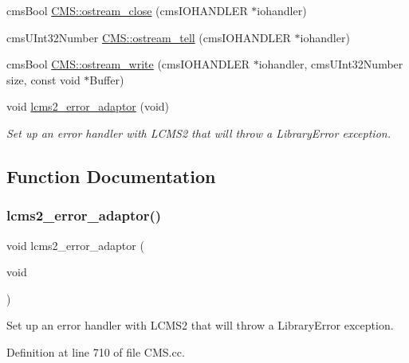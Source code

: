 \begin{DoxyCompactItemize}
\item 
cms\+Bool \hyperlink{namespace_c_m_s_a57d6234e6fb36cc71bcae4a825ad3ba0}{C\+M\+S\+::ostream\+\_\+close} (cms\+I\+O\+H\+A\+N\+D\+L\+ER $\ast$iohandler)
\item 
cms\+U\+Int32\+Number \hyperlink{namespace_c_m_s_a4420e9cff988db0418ae3a9c76ec5f9e}{C\+M\+S\+::ostream\+\_\+tell} (cms\+I\+O\+H\+A\+N\+D\+L\+ER $\ast$iohandler)
\item 
cms\+Bool \hyperlink{namespace_c_m_s_ac6a6e80213301c0cbce0fcd8a98e6108}{C\+M\+S\+::ostream\+\_\+write} (cms\+I\+O\+H\+A\+N\+D\+L\+ER $\ast$iohandler, cms\+U\+Int32\+Number size, const void $\ast$Buffer)
\item 
void \hyperlink{_c_m_s_8hh_a18e192f42eedbbf828a1ed4ed61a0f68}{lcms2\+\_\+error\+\_\+adaptor} (void)
\begin{DoxyCompactList}\small\item\em Set up an error handler with L\+C\+M\+S2 that will throw a Library\+Error exception. \end{DoxyCompactList}\end{DoxyCompactItemize}


\subsection{Function Documentation}
\mbox{\label{_c_m_s_8hh_a18e192f42eedbbf828a1ed4ed61a0f68}} 
\subsubsection{\texorpdfstring{lcms2\+\_\+error\+\_\+adaptor()}{lcms2\_error\_adaptor()}}
{\footnotesize\ttfamily void lcms2\+\_\+error\+\_\+adaptor (\begin{DoxyParamCaption}\item[{void}]{ }\end{DoxyParamCaption})}



Set up an error handler with L\+C\+M\+S2 that will throw a Library\+Error exception. 



Definition at line 710 of file C\+M\+S.\+cc.

